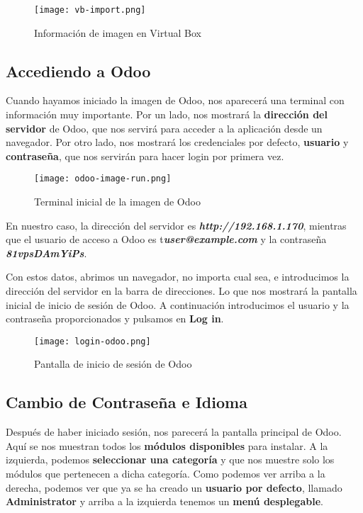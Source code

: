 \begin{figure}[ht]
    \centering
    \texttt{[image: vb-import.png]}
    \caption{Información de imagen en Virtual Box}
\end{figure}


\subsection{Accediendo a Odoo}
Cuando hayamos iniciado la imagen de Odoo, nos aparecerá una terminal con información muy importante. Por un lado, nos mostrará la \textbf{dirección del servidor} de Odoo, que nos servirá para acceder a la aplicación desde un navegador. Por otro lado, nos mostrará los credenciales por defecto, \textbf{usuario} y \textbf{contraseña}, que nos servirán para hacer login por primera vez.

\begin{figure}[ht]
    \centering
    \texttt{[image: odoo-image-run.png]}
    \caption{Terminal inicial de la imagen de Odoo}
\end{figure}

En nuestro caso, la dirección del servidor es \textbf{\textit{http://192.168.1.170}}, mientras que el usuario de acceso a Odoo es t\textbf{\textit{user@example.com}} y la contraseña \textbf{\textit{81vpsDAmYiPs}}.

Con estos datos, abrimos un navegador, no importa cual sea, e introducimos la dirección del servidor en la barra de direcciones. Lo que nos mostrará la pantalla inicial de inicio de sesión de Odoo. A continuación introducimos el usuario y la contraseña proporcionados y pulsamos en \textbf{Log in}.


\begin{figure}[ht]
    \centering
    \texttt{[image: login-odoo.png]}
    \caption{Pantalla de inicio de sesión de Odoo}
\end{figure}

\subsection{Cambio de Contraseña e Idioma}
Después de haber iniciado sesión, nos parecerá la pantalla principal de Odoo. Aquí se nos muestran todos los\textbf{ módulos disponibles} para instalar. A la izquierda, podemos \textbf{seleccionar una categoría} y que nos muestre solo los módulos que pertenecen a dicha categoría. Como podemos ver arriba a la derecha, podemos ver que ya se ha creado un \textbf{usuario por defecto}, llamado \textbf{Administrator} y arriba a la izquierda tenemos un \textbf{menú desplegable}.

